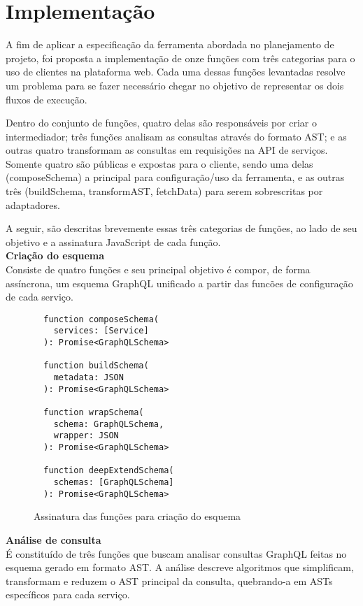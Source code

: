 \section{Implementação}

A fim de aplicar a especificação da ferramenta abordada no planejamento de projeto, foi proposta a implementação de onze funções com três categorias para o uso de clientes na plataforma web. Cada uma dessas funções levantadas resolve um problema para se fazer necessário chegar no objetivo de representar os dois fluxos de execução.

Dentro do conjunto de funções, quatro delas são responsáveis por criar o intermediador; três funções analisam as consultas através do formato AST; e as outras quatro transformam as consultas em requisições na API de serviços. Somente quatro são públicas e expostas para o cliente, sendo uma delas (composeSchema) a principal para configuração/uso da ferramenta, e as outras três (buildSchema, transformAST, fetchData) para serem sobrescritas por adaptadores. 

A seguir, são descritas brevemente essas três categorias de funções, ao lado de seu objetivo e a assinatura JavaScript de cada função. \\

\textbf{Criação do esquema} \\

Consiste de quatro funções e seu principal objetivo é compor, de forma assíncrona, um esquema GraphQL unificado a partir das funcões de configuração de cada serviço.

\begin{figure}[H]
  \centering
  \begin{verbatim}
  function composeSchema(
    services: [Service]
  ): Promise<GraphQLSchema>

  function buildSchema(
    metadata: JSON
  ): Promise<GraphQLSchema>

  function wrapSchema(
    schema: GraphQLSchema,
    wrapper: JSON
  ): Promise<GraphQLSchema>

  function deepExtendSchema(
    schemas: [GraphQLSchema]
  ): Promise<GraphQLSchema>
  \end{verbatim}
  \caption{Assinatura das funções para criação do esquema}
\end{figure}

\textbf{Análise de consulta} \\

É constituído de três funções que buscam analisar consultas GraphQL feitas no esquema gerado em formato AST. A análise descreve algoritmos que simplificam, transformam e reduzem o AST principal da consulta, quebrando-a em ASTs específicos para cada serviço.

